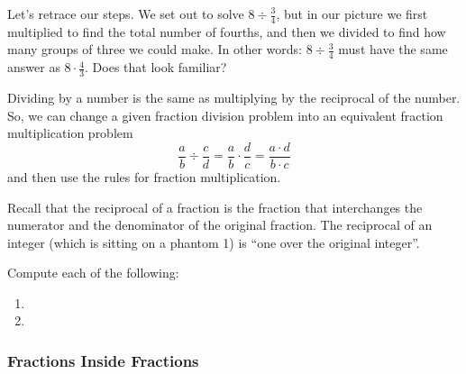Let's retrace our steps. We set out to solve $8 \div \frac{3}{4}$, but in our picture we first multiplied to find the total number of fourths, and then we divided to find how many groups of three we could make. In other words: $8 \div \frac{3}{4}$ must have the same answer as $8 \cdot \frac{4}{3}$. Does that look familiar?

\begin{boxeddef}
Dividing by a number is the same as multiplying by the reciprocal of the number. So, we can change a given fraction division problem into an equivalent fraction multiplication problem \[\frac{a}{b} \div \frac{c}{d} = \frac{a}{b} \cdot \frac{d}{c} = \frac{a \cdot d}{b \cdot c}\] and then use the rules for fraction multiplication.
\end{boxeddef}

Recall that the \gls{reciprocal} of a fraction is the fraction that interchanges the numerator and the denominator of the original fraction. The reciprocal of an integer (which is sitting on a phantom 1) is ``one over the original integer''.

\begin{boxedex}
Compute each of the following:

\bigskip\begin{enumerate}[itemsep=10pt]
\item {}

\item {}
\end{enumerate}
\end{boxedex}

\subsubsection*{Fractions Inside Fractions}

